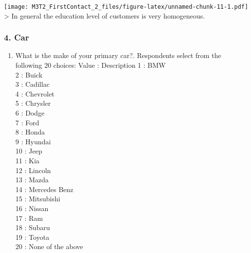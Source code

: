 \documentclass[
]{article}
\newenvironment{Shaded}{\begin{snugshade}}{\end{snugshade}}
\newcommand{\AttributeTok}[1]{\textcolor[rgb]{0.77,0.63,0.00}{#1}}
\newcommand{\CommentTok}[1]{\textcolor[rgb]{0.56,0.35,0.01}{\textit{#1}}}
\newcommand{\ConstantTok}[1]{\textcolor[rgb]{0.00,0.00,0.00}{#1}}
\newcommand{\DecValTok}[1]{\textcolor[rgb]{0.00,0.00,0.81}{#1}}
\newcommand{\FloatTok}[1]{\textcolor[rgb]{0.00,0.00,0.81}{#1}}
\newcommand{\FunctionTok}[1]{\textcolor[rgb]{0.00,0.00,0.00}{#1}}
\newcommand{\NormalTok}[1]{#1}
\newcommand{\OtherTok}[1]{\textcolor[rgb]{0.56,0.35,0.01}{#1}}
\newcommand{\SpecialCharTok}[1]{\textcolor[rgb]{0.00,0.00,0.00}{#1}}
\newcommand{\StringTok}[1]{\textcolor[rgb]{0.31,0.60,0.02}{#1}}
\providecommand{\tightlist}{%
  \setlength{\itemsep}{0pt}\setlength{\parskip}{0pt}}
\begin{document}
\begin{Shaded}
\end{Shaded}

\texttt{[image: M3T2\_FirstContact\_2\_files/figure-latex/unnamed-chunk-11-1.pdf]}
\textgreater{} In general the education level of customers is very
homogeneous.

\hypertarget{car}{%
\subsubsection{4. Car}\label{car}}

\begin{enumerate}
\def\labelenumi{\arabic{enumi})}
\setcounter{enumi}{3}
\tightlist
\item
  What is the make of your primary car?. Respondents select from the
  following 20 choices: Value : Description 1 : BMW\\
  2 : Buick\\
  3 : Cadillac\\
  4 : Chevrolet\\
  5 : Chrysler\\
  6 : Dodge\\
  7 : Ford\\
  8 : Honda\\
  9 : Hyundai\\
  10 : Jeep\\
  11 : Kia\\
  12 : Lincoln\\
  13 : Mazda\\
  14 : Mercedes Benz\\
  15 : Mitsubishi\\
  16 : Nissan\\
  17 : Ram\\
  18 : Subaru\\
  19 : Toyota\\
  20 : None of the above
\end{enumerate}
\end{document}
